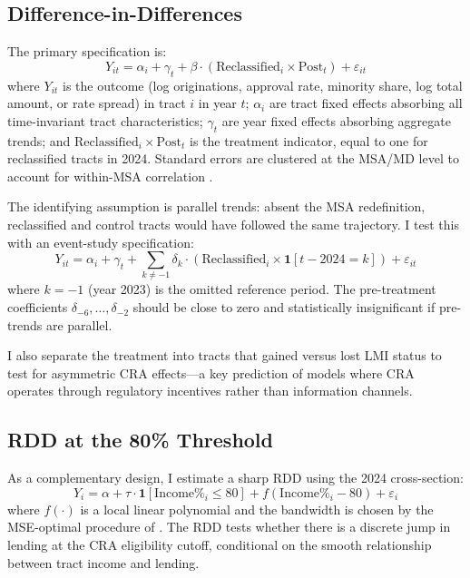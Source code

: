 \documentclass[12pt]{article}
\begin{document}
\subsection{Difference-in-Differences}

The primary specification is:
\begin{equation}
Y_{it} = \alpha_i + \gamma_t + \beta \cdot (\text{Reclassified}_i \times \text{Post}_t) + \varepsilon_{it}
\label{eq:did}
\end{equation}
where $Y_{it}$ is the outcome (log originations, approval rate, minority share, log total amount, or rate spread) in tract $i$ in year $t$; $\alpha_i$ are tract fixed effects absorbing all time-invariant tract characteristics; $\gamma_t$ are year fixed effects absorbing aggregate trends; and $\text{Reclassified}_i \times \text{Post}_t$ is the treatment indicator, equal to one for reclassified tracts in 2024. Standard errors are clustered at the MSA/MD level to account for within-MSA correlation \citep{roth2023s}.

The identifying assumption is parallel trends: absent the MSA redefinition, reclassified and control tracts would have followed the same trajectory. I test this with an event-study specification:
\begin{equation}
Y_{it} = \alpha_i + \gamma_t + \sum_{k \neq -1} \delta_k \cdot (\text{Reclassified}_i \times \mathbf{1}[t - 2024 = k]) + \varepsilon_{it}
\label{eq:eventstudy}
\end{equation}
where $k = -1$ (year 2023) is the omitted reference period. The pre-treatment coefficients $\delta_{-6}, \ldots, \delta_{-2}$ should be close to zero and statistically insignificant if pre-trends are parallel.

I also separate the treatment into tracts that gained versus lost LMI status to test for asymmetric CRA effects---a key prediction of models where CRA operates through regulatory incentives rather than information channels.

\subsection{RDD at the 80\% Threshold}

As a complementary design, I estimate a sharp RDD using the 2024 cross-section:
\begin{equation}
Y_i = \alpha + \tau \cdot \mathbf{1}[\text{Income\%}_i \leq 80] + f(\text{Income\%}_i - 80) + \varepsilon_i
\end{equation}
where $f(\cdot)$ is a local linear polynomial and the bandwidth is chosen by the MSE-optimal procedure of \citet{calonico2014robust}. The RDD tests whether there is a discrete jump in lending at the CRA eligibility cutoff, conditional on the smooth relationship between tract income and lending.
\end{document}
